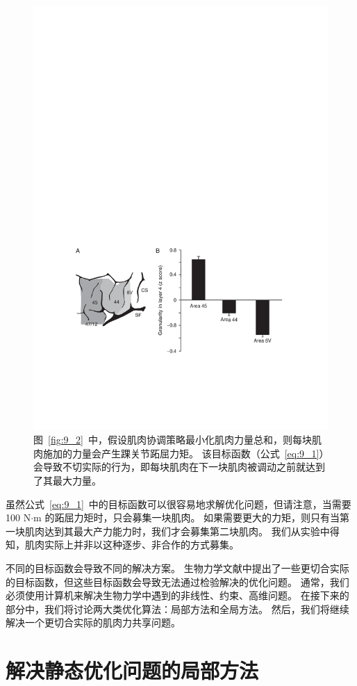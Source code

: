 \begin{figure}[!htb]
	\centering
	\includegraphics[width=0.75\linewidth]{chap9/9_3}
	\caption{图~\ref{fig:9_2}~中，假设肌肉协调策略最小化肌肉力量总和，则每块肌肉施加的力量会产生踝关节跖屈力矩。
		该目标函数（公式~\ref{eq:9_1}）会导致不切实际的行为，即每块肌肉在下一块肌肉被调动之前就达到了其最大力量。 \label{fig:9_3}}
\end{figure}


虽然公式~\ref{eq:9_1}~中的目标函数可以很容易地求解优化问题，但请注意，当需要 100 N$\cdot$m 的跖屈力矩时，只会募集一块肌肉。
如果需要更大的力矩，则只有当第一块肌肉达到其最大产力能力时，我们才会募集第二块肌肉。
我们从实验中得知，肌肉实际上并非以这种逐步、非合作的方式募集。


不同的目标函数会导致不同的解决方案。
生物力学文献中提出了一些更切合实际的目标函数，但这些目标函数会导致无法通过检验解决的优化问题。
通常，我们必须使用计算机来解决生物力学中遇到的非线性、约束、高维问题。
在接下来的部分中，我们将讨论两大类优化算法：局部方法和全局方法。
然后，我们将继续解决一个更切合实际的肌肉力共享问题。



\section{解决静态优化问题的局部方法}

